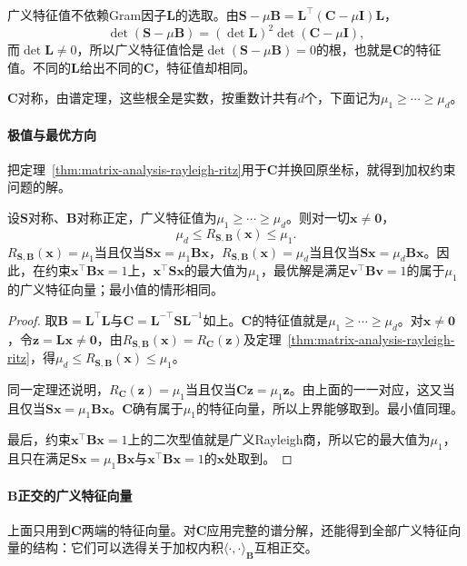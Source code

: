广义特征值不依赖Gram因子$\bm L$的选取。由$\bm S-\mu\bm B=\bm L^\top(\bm C-\mu\bm I)\bm L$，
\[
 \det(\bm S-\mu\bm B)=(\det\bm L)^2\det(\bm C-\mu\bm I),
\]
而$\det\bm L\neq0$，所以广义特征值恰是$\det(\bm S-\mu\bm B)=0$的根，也就是$\bm C$的特征值。不同的$\bm L$给出不同的$\bm C$，特征值却相同。

$\bm C$对称，由谱定理，这些根全是实数，按重数计共有$d$个，下面记为$\mu_1\geq\cdots\geq\mu_d$。

\paragraph{极值与最优方向}
把定理~\ref{thm:matrix-analysis-rayleigh-ritz}用于$\bm C$并换回原坐标，就得到加权约束问题的解。

\begin{theorem}[广义Rayleigh商的极值]
\label{thm:ls-generalized-rayleigh-extremal}
设$\bm S$对称、$\bm B$对称正定，广义特征值为$\mu_1\geq\cdots\geq\mu_d$。则对一切$\bm x\neq\bm0$，
\begin{equation}
 \mu_d\leq R_{\bm S,\bm B}(\bm x)\leq\mu_1 .
 \label{eq:ls-generalized-rayleigh-extremal}
\end{equation}
$R_{\bm S,\bm B}(\bm x)=\mu_1$当且仅当$\bm S\bm x=\mu_1\bm B\bm x$，$R_{\bm S,\bm B}(\bm x)=\mu_d$当且仅当$\bm S\bm x=\mu_d\bm B\bm x$。因此，在约束$\bm x^\top\bm B\bm x=1$上，$\bm x^\top\bm S\bm x$的最大值为$\mu_1$，最优解是满足$\bm v^\top\bm B\bm v=1$的属于$\mu_1$的广义特征向量；最小值的情形相同。
\end{theorem}
\begin{proof}
取$\bm B=\bm L^\top\bm L$与$\bm C=\bm L^{-\top}\bm S\bm L^{-1}$如上。$\bm C$的特征值就是$\mu_1\geq\cdots\geq\mu_d$。对$\bm x\neq\bm0$，令$\bm z=\bm L\bm x\neq\bm0$，由$R_{\bm S,\bm B}(\bm x)=R_{\bm C}(\bm z)$及定理~\ref{thm:matrix-analysis-rayleigh-ritz}，得$\mu_d\leq R_{\bm S,\bm B}(\bm x)\leq\mu_1$。

同一定理还说明，$R_{\bm C}(\bm z)=\mu_1$当且仅当$\bm C\bm z=\mu_1\bm z$。由上面的一一对应，这又当且仅当$\bm S\bm x=\mu_1\bm B\bm x$。$\bm C$确有属于$\mu_1$的特征向量，所以上界能够取到。最小值同理。

最后，约束$\bm x^\top\bm B\bm x=1$上的二次型值就是广义Rayleigh商，所以它的最大值为$\mu_1$，且只在满足$\bm S\bm x=\mu_1\bm B\bm x$与$\bm x^\top\bm B\bm x=1$的$\bm x$处取到。
\end{proof}

\paragraph{\texorpdfstring{$\bm B$}{B}正交的广义特征向量}
上面只用到$\bm C$两端的特征向量。对$\bm C$应用完整的谱分解，还能得到全部广义特征向量的结构：它们可以选得关于加权内积$\langle\cdot,\cdot\rangle_{\bm B}$互相正交。


